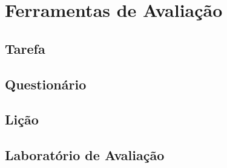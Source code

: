 \chapter{Ferramentas de Avaliação}
\label{cap8}

\section{Tarefa}

\section{Questionário}

\section{Lição}

\section{Laboratório de Avaliação}

